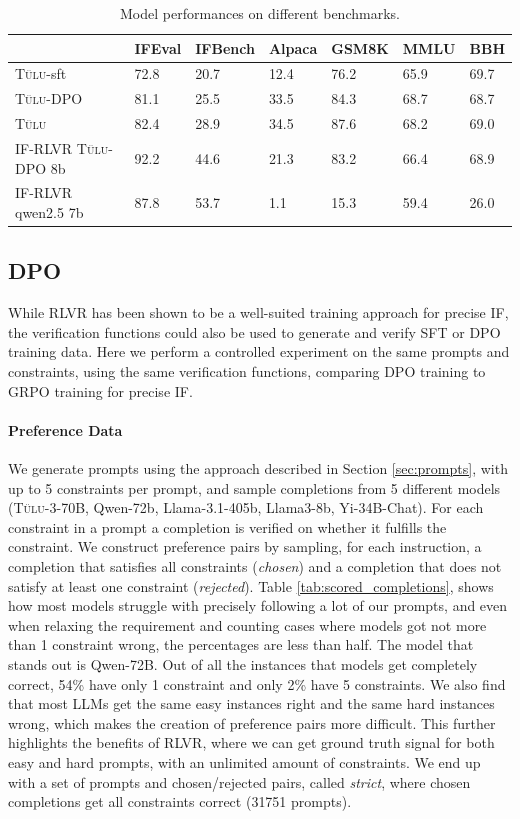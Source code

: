 \documentclass{article}
\newcommand{\tulu}{\textsc{T\"ulu}\xspace}
\begin{document}
\begin{table}[]
\centering
        \caption{Model performances on different benchmarks.}
            \label{tab:final}
\begin{tabular}{lllllll}
\hline \toprule
                    & IFEval & IFBench & Alpaca & GSM8K & MMLU & BBH  \\ \midrule
\tulu-sft            & 72.8   & 20.7    & 12.4   & 76.2  & 65.9 & 69.7 \\
\tulu-DPO            & 81.1   & 25.5    & 33.5   & 84.3  & 68.7 & 68.7 \\
\tulu                & 82.4   & 28.9    & 34.5   & 87.6  & 68.2 & 69.0 \\ \midrule
IF-RLVR \tulu-DPO 8b & 92.2   & 44.6    & 21.3   & 83.2  & 66.4 & 68.9 \\
IF-RLVR qwen2.5 7b  & 87.8   & 53.7    & 1.1    & 15.3  & 59.4 & 26.0 \\ \bottomrule   
\end{tabular}
\end{table}

\subsection{DPO}
While RLVR has been shown to be a well-suited training approach for precise IF, the verification functions could also be used to generate and verify SFT or DPO training data. Here we perform a controlled experiment on the same prompts and constraints, using the same verification functions, comparing DPO training to GRPO training for precise IF.

\paragraph{Preference Data}
We generate prompts using the approach described in Section \ref{sec:prompts}, with up to 5 constraints per prompt, and sample completions from 5 different models (\tulu-3-70B, Qwen-72b, Llama-3.1-405b, Llama3-8b, Yi-34B-Chat). For each constraint in a prompt a completion is verified on whether it fulfills the constraint. We construct preference pairs by sampling, for each instruction, a completion that satisfies all constraints (\textit{chosen}) and a completion that does not satisfy at least one constraint (\textit{rejected}). 
Table \ref{tab:scored_completions}, shows how most models struggle with precisely following a lot of our prompts, and even when relaxing the requirement and counting cases where models got not more than 1 constraint wrong, the percentages are less than half. The model that stands out is Qwen-72B. Out of all the instances that models get completely correct, 54\% have only 1 constraint and only 2\% have 5 constraints. We also find that most LLMs get the same easy instances right and the same hard instances wrong, which makes the creation of preference pairs more difficult. This further highlights the benefits of RLVR, where we can get ground truth signal for both easy and hard prompts, with an unlimited amount of constraints. We end up with a set of prompts and chosen/rejected pairs, called \textit{strict}, where chosen completions get all constraints correct (31751 prompts).
\end{document}

